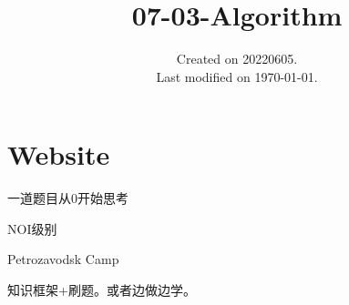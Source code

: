 \documentclass[UTF8]{../computerUniverse}
\begin{document}
\title{07-03-Algorithm}
\date{Created on 20220605.\\   Last modified on \today.}
\maketitle
\tableofcontents



\chapter{Website}

一道题目从0开始思考

NOI级别

Petrozavodsk Camp


知识框架+刷题。或者边做边学。
\end{document}
